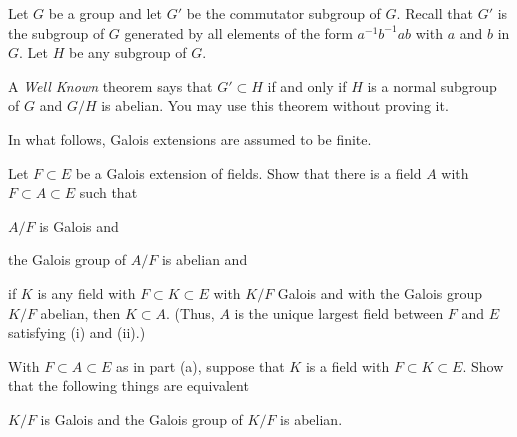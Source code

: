 Let $G$ be a group and let $G'$ be the commutator subgroup of
$G$. Recall that $G'$ is the subgroup of $G$ generated by all elements
of the form $a^{-1}b^{-1}ab$ with $a$ and $b$ in $G$. Let $H$ be any
subgroup of $G$. 

A \emph{Well Known} theorem says that $G'\subset H$ if and only if $H$
is a normal subgroup of $G$ and $G/H$ is abelian.  You may use this
theorem without proving it.

In what follows, Galois extensions are assumed to be finite.
\begin{alist}
\item Let $F\subset E$ be a Galois extension of fields. Show that
there is a field $A$ with $F\subset A\subset E$ such that
\begin{rlist}
\item $A/F$ is Galois and
\item the Galois group of $A/F$ is abelian and
\item if $K$ is any field with $F\subset K\subset E$ with $K/F$ Galois
and with the Galois group $K/F$ abelian, then $K\subset A$. (Thus, $A$
is the unique largest field between $F$ and $E$ satisfying (i) and
(ii).)
\end{rlist}
\item With $F\subset A\subset E$ as in part (a), suppose that $K$ is a
field with $F\subset K\subset E$. Show that the following things are
equivalent
\begin{rlist}
\item $K/F$ is Galois and the Galois group of $K/F$ is abelian.

\end{rlist}
\end{alist}
